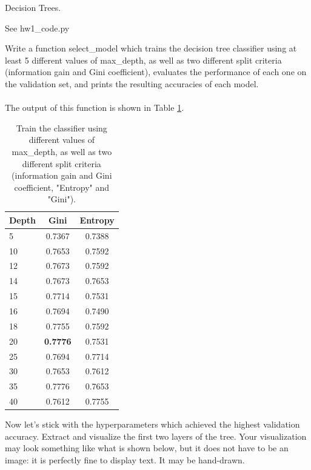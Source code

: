 \documentclass{myhw}
\begin{document}
\begin{homeworkProblem}
Decision Trees.
\begin{homeworkSection}
See hw1\_code.py
\end{homeworkSection}
\begin{homeworkSection}
Write a function select\_model which trains the decision tree classifier using at least 5 different values of max\_depth, as well as two different split criteria (information gain and Gini coefficient), evaluates the performance of each one on the validation set, and prints the resulting accuracies of each model.\\
\\
The output of this function is shown in Table \ref{TAB:BEST}. 
\begin{table}[h]
  \centering
    \begin{tabular}{l c c} 
    \toprule[1pt]  
    Depth & Gini & Entropy \\
    \midrule[0.7pt] 
    5 & 0.7367 & 0.7388 \\
    10 & 0.7653 & 0.7592 \\
    12 & 0.7673 & 0.7592 \\
    14 & 0.7673 & 0.7653 \\
    15 & 0.7714 & 0.7531 \\
    16 & 0.7694 & 0.7490 \\
    18 & 0.7755 & 0.7592 \\
    20 & \textbf{0.7776} & 0.7531 \\
    25 & 0.7694 & 0.7714 \\
    30 & 0.7653 & 0.7612 \\
    35 & 0.7776 & 0.7653 \\
    40 & 0.7612 & 0.7755 \\
    \bottomrule[1pt]  
    \end{tabular}
    \caption{Train the classifier using different values of max\_depth, as well as two different split criteria (information gain and Gini coefficient, "Entropy" and "Gini"). }
    \label{TAB:BEST}
\end{table}
\end{homeworkSection}
\begin{homeworkSection}
Now let’s stick with the hyperparameters which achieved the highest validation accuracy. Extract and visualize the first two layers of the tree. Your visualization may look something like what is shown below, but it does not have to be an image: it is perfectly fine to display text. It may be hand-drawn. \\

\end{homeworkSection}
\end{homeworkProblem}
\end{document}
